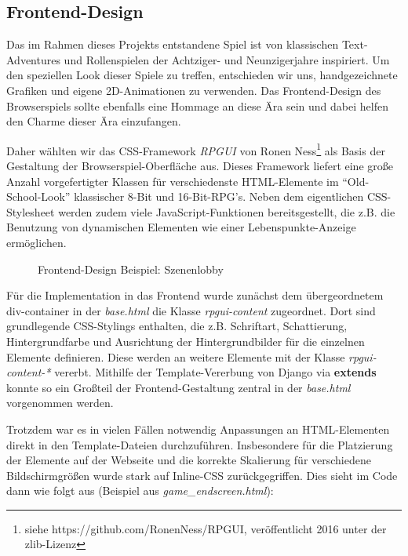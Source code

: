 \pagebreak
\subsection{Frontend-Design}
Das im Rahmen dieses Projekts entstandene Spiel ist von klassischen Text-Adventures und Rollenspielen der Achtziger- und Neunzigerjahre inspiriert. Um den speziellen Look dieser Spiele zu treffen, entschieden wir uns, handgezeichnete Grafiken und eigene 2D-Animationen zu verwenden. Das Frontend-Design des Browserspiels sollte ebenfalls eine Hommage an diese Ära sein und dabei helfen den Charme dieser Ära einzufangen. 

Daher wählten wir das CSS-Framework \textit{RPGUI} von Ronen Ness\footnote{siehe https://github.com/RonenNess/RPGUI, veröffentlicht 2016 unter der zlib-Lizenz} als Basis der Gestaltung der Browserspiel-Oberfläche aus. Dieses Framework liefert eine große Anzahl vorgefertigter Klassen für verschiedenste HTML-Elemente im \enquote{Old-School-Look} klassischer 8-Bit und 16-Bit-RPG's. Neben dem eigentlichen CSS-Stylesheet werden zudem viele JavaScript-Funktionen bereitsgestellt, die z.B. die Benutzung von dynamischen Elementen wie einer Lebenspunkte-Anzeige ermöglichen.

\begin{figure}[H]
    \centering
    \caption{Frontend-Design Beispiel: Szenenlobby}
    \label{fig:frontend_rpgui_example}
\end{figure}

Für die Implementation in das Frontend wurde zunächst dem übergeordnetem div-container in der \textit{base.html} die Klasse \textit{rpgui-content} zugeordnet. Dort sind grundlegende CSS-Stylings enthalten, die z.B. Schriftart, Schattierung, Hintergrundfarbe und Ausrichtung der Hintergrundbilder für die einzelnen Elemente definieren. Diese werden an weitere Elemente mit der Klasse \textit{rpgui-content-*} vererbt. Mithilfe der Template-Vererbung von Django via \textbf{extends} konnte so ein Großteil der Frontend-Gestaltung zentral in der \textit{base.html} vorgenommen werden.

Trotzdem war es in vielen Fällen notwendig Anpassungen an HTML-Elementen direkt in den Template-Dateien durchzuführen. Insbesondere für die Platzierung der Elemente auf der Webseite und die korrekte Skalierung für verschiedene Bildschirmgrößen wurde stark auf Inline-CSS zurückgegriffen. Dies sieht im Code dann wie folgt aus (Beispiel aus \textit{game\_endscreen.html}):

